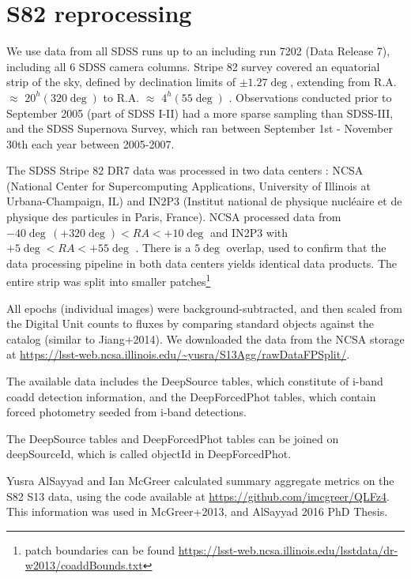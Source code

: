 \documentclass[fleqn,usenatbib]{mnras}  %
\begin{document}
\section{S82 reprocessing}
\label{sec:data}

We use data from all SDSS runs up to an including run 7202 (Data Release 7), including all 6 SDSS camera columns. Stripe 82 survey covered an equatorial strip of the sky, defined by declination limits of $\pm1.27\deg$, extending from R.A. $\approx$ $20^{h} (320 \deg)$ to R.A.  $\approx$ $4^{h} (55 \deg)$ \citep{sesar2007,sesar2010}. Observations conducted prior to September 2005 (part of SDSS I-II) had a more sparse sampling than SDSS-III, and the SDSS Supernova Survey, which ran between September 1st - November 30th each year between 2005-2007. 

The SDSS Stripe 82 DR7  data  was processed in two data centers : NCSA (National Center for Supercomputing Applications, University of Illinois at Urbana-Champaign, IL) and IN2P3  (Institut national de physique nucl\'eaire et de physique des particules in Paris, France). NCSA processed data from $-40 \deg \, (+320 \deg) < RA < +10 \deg $ and IN2P3 with $ +5 \deg < RA < +55 \deg$ . There is a $5 \deg$ overlap, used to confirm that the data processing pipeline in both data centers yields identical data products. The entire strip was split into smaller patches\footnote{patch boundaries can be found \url{https://lsst-web.ncsa.illinois.edu/lsstdata/dr-w2013/coaddBounds.txt} }

All epochs (individual images) were background-subtracted, and then scaled from the Digital Unit counts to fluxes by comparing standard objects against the \citep{ivezic2007} catalog  (similar to  Jiang+2014). We downloaded the data from the NCSA storage at \url{https://lsst-web.ncsa.illinois.edu/~yusra/S13Agg/rawDataFPSplit/}.   

The available data includes the DeepSource tables, which constitute of i-band coadd detection information,  and the DeepForcedPhot  tables, which contain forced photometry seeded from i-band detections. 

The DeepSource tables  and DeepForcedPhot tables can be joined on deepSourceId, which is called objectId in DeepForcedPhot. 

Yusra AlSayyad and Ian McGreer calculated summary aggregate metrics on the S82 S13 data, using the code available at \url{https://github.com/imcgreer/QLFz4}. This information was used in McGreer+2013, and AlSayyad 2016 PhD Thesis.  
\end{document}
